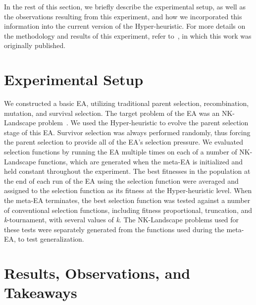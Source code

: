 \documentclass[times,12pt,titlepage]{mstogs}
\begin{document}
\begin{ThesisBody}
In the rest of this section, we briefly describe the experimental setup, as well as the observations resulting from this experiment, and how we incorporated this information into the current version of the Hyper-heuristic. For more details on the methodology and results of this experiment, refer to~\citep{richter2018adpsea}, in which this work was originally published.

\section{Experimental Setup}
\label{Experimental Setup-Original}

We constructed a basic EA, utilizing traditional parent selection, recombination, mutation, and survival selection. The target problem of the EA was an NK-Landscape problem~\citep{whitley2016gray,kaufmann1993origins}. We used the Hyper-heuristic to evolve the parent selection stage of this EA. Survivor selection was always performed randomly, thus forcing the parent selection to provide all of the EA's selection pressure. We evaluated selection functions by running the EA multiple times on each of a number of NK-Landscape functions, which are generated when the meta-EA is initialized and held constant throughout the experiment. The best fitnesses in the population at the end of each run of the EA using the selection function were averaged and assigned to the selection function as its fitness at the Hyper-heuristic level. When the meta-EA terminates, the best selection function was tested against a number of conventional selection functions, including fitness proportional, truncation, and \textit{k}-tournament, with several values of \textit{k}. The NK-Landscape problems used for these tests were separately generated from the functions used during the meta-EA, to test generalization.

\section{Results, Observations, and Takeaways}
\label{Results-Original}


\end{ThesisBody}
\end{document}
